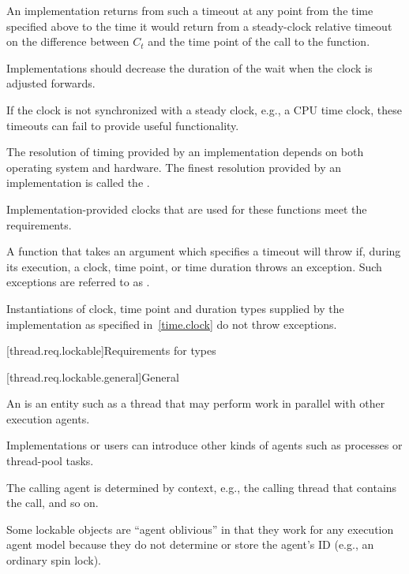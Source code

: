An implementation returns from such a timeout at any point from the time specified above to
the time it would return from a steady-clock relative timeout on the difference between $C_t$
and the time point of the call to the  function.

\recommended
Implementations
should decrease the duration of the wait when the clock is adjusted forwards.

\pnum
\begin{note}
If the clock is not synchronized with a steady clock, e.g., a CPU time clock, these
timeouts can fail to provide useful functionality.
\end{note}

\pnum
The resolution of timing provided by an implementation depends on both operating system
and hardware. The finest resolution provided by an implementation is called the
.

\pnum
Implementation-provided clocks that are used for these functions meet the
 requirements.

\pnum
A function that takes an argument which specifies a timeout will throw if,
during its execution, a clock, time point, or time duration throws an exception.
Such exceptions are referred to as .
\begin{note}
Instantiations of clock, time point and duration types supplied by
the implementation as specified in~\ref{time.clock} do not throw exceptions.
\end{note}

[thread.req.lockable]{Requirements for  types}

[thread.req.lockable.general]{General}

\pnum
An  is an entity such as a thread that may perform work in parallel with
other execution agents.
\begin{note}
Implementations or users can introduce other kinds of
agents such as processes or thread-pool tasks.
\end{note}
The calling agent is determined by
context, e.g., the calling thread that contains the call, and so on.

\pnum
\begin{note}
Some lockable objects are ``agent oblivious'' in that they work for any
execution agent model because they do not determine or store the agent's ID (e.g., an
ordinary spin lock).
\end{note}

